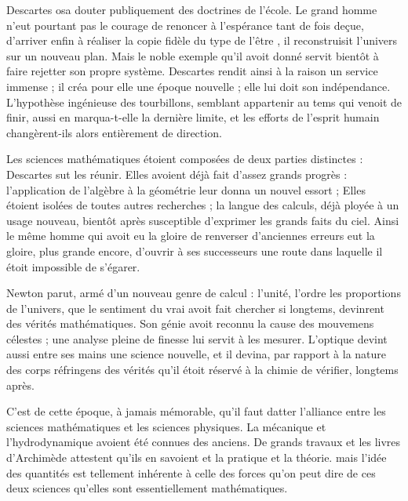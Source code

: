 \documentclass[11pt,a4paper]{article}
\begin{document}
Descartes osa douter publiquement des doctrines de l'école.
 Le grand homme n'eut pourtant pas le courage de renoncer à
l'espérance  tant de fois deçue, d'arriver enfin à
réaliser la copie fidèle du type de l'être , il reconstruisit l'univers
 sur un nouveau plan. Mais le noble exemple qu'il avoit
donné servit bientôt à faire rejetter son propre système.
Descartes rendit ainsi à la
raison  un service immense ; il créa pour elle une
époque nouvelle ; elle lui doit son indépendance. L'hypothèse ingénieuse
des tourbillons, semblant appartenir au tems qui venoit de finir, aussi
en marqua-t-elle la dernière limite, et les efforts de l'esprit humain
changèrent-ils alors entièrement de direction.

Les sciences mathématiques étoient composées de deux parties
distinctes : Descartes sut les réunir. Elles avoient déjà fait d'assez
grands progrès : l'application de l'algèbre à la géométrie leur donna un
nouvel essort ; Elles étoient isolées de toutes autres recherches ; la
langue des calculs, déjà ployée à un usage nouveau, 
 bientôt après susceptible d'exprimer les grands faits du
ciel. Ainsi le
même homme qui avoit  eu la gloire de renverser d'anciennes
erreurs eut la gloire, plus grande encore, d'ouvrir à ses successeurs
une route dans laquelle il étoit impossible  de s'égarer.

Newton parut, armé d'un nouveau genre de calcul :  l'unité,
l'ordre  les proportions de l'univers, que le sentiment du
vrai avoit fait chercher si longtems, devinrent des vérités
mathématiques. Son génie avoit reconnu la cause des mouvemens célestes ;
une analyse pleine de finesse lui servit à les mesurer. L'optique devint
aussi entre ses mains une science nouvelle, et il devina, par rapport à
la nature des corps réfringens des vérités qu'il étoit réservé à la
chimie de vérifier, longtems après.

C'est de cette époque, à jamais mémorable, qu'il faut datter l'alliance
entre les sciences mathématiques et les sciences physiques. La mécanique
et l'hydrodynamique avoient été connues des anciens. De grands travaux
et les livres d'Archimède attestent qu'ils en savoient et la pratique et
la théorie. mais l'idée des quantités est tellement inhérente à celle
des forces qu'on peut dire de ces deux sciences qu'elles sont
essentiellement mathématiques.
\end{document}
